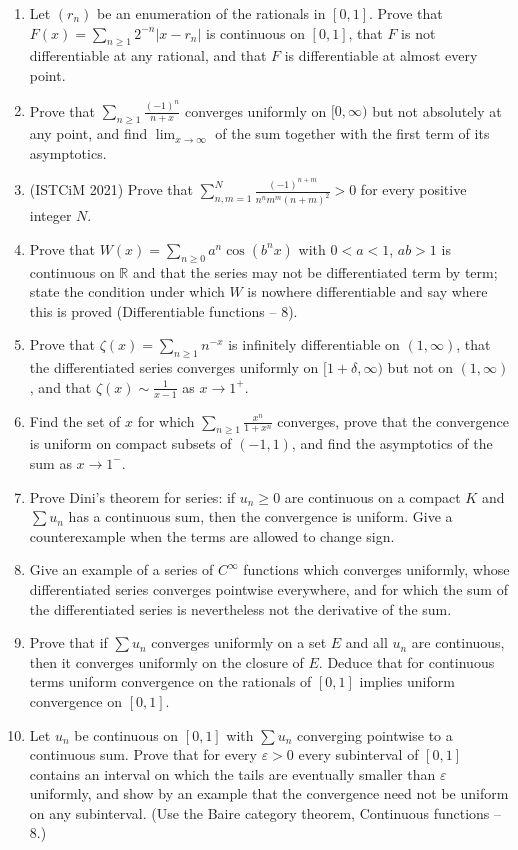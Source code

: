 \documentclass[11pt,a4paper]{article}
\renewcommand{\ge}{\geqslant}
\begin{document}
\begin{enumerate}[itemsep=0.6em]
\item Let $(r_n)$ be an enumeration of the rationals in $[0,1]$. Prove that
$F(x)=\sum_{n\ge1}2^{-n}|x-r_n|$ is continuous on $[0,1]$, that $F$ is not differentiable at any
rational, and that $F$ is differentiable at almost every point.

\item Prove that $\sum_{n\ge1}\frac{(-1)^n}{n+x}$ converges uniformly on $[0,\infty)$ but not
absolutely at any point, and find $\lim_{x\to\infty}$ of the sum together with the first term of
its asymptotics.

\item (ISTCiM 2021) Prove that $\sum\limits_{n,m=1}^N\frac{(-1)^{n+m}}{n^nm^m(n+m)^2}>0$ for every
positive integer $N$.

\item Prove that $W(x)=\sum_{n\ge0}a^n\cos(b^nx)$ with $0<a<1$, $ab>1$ is continuous on $\mathbb R$
and that the series may not be differentiated term by term; state the condition under which $W$ is
nowhere differentiable and say where this is proved (Differentiable functions -- 8).

\item Prove that $\zeta(x)=\sum_{n\ge1}n^{-x}$ is infinitely differentiable on $(1,\infty)$, that the
differentiated series converges uniformly on $[1+\delta,\infty)$ but not on $(1,\infty)$, and that
$\zeta(x)\sim\frac1{x-1}$ as $x\to1^+$.

\item Find the set of $x$ for which $\sum_{n\ge1}\frac{x^n}{1+x^n}$ converges, prove that the
convergence is uniform on compact subsets of $(-1,1)$, and find the asymptotics of the sum as
$x\to1^-$.

\item Prove Dini's theorem for series: if $u_n\ge0$ are continuous on a compact $K$ and $\sum u_n$
has a continuous sum, then the convergence is uniform. Give a counterexample when the terms are
allowed to change sign.

\item Give an example of a series of $C^\infty$ functions which converges uniformly, whose
differentiated series converges pointwise everywhere, and for which the sum of the differentiated
series is nevertheless not the derivative of the sum.

\item Prove that if $\sum u_n$ converges uniformly on a set $E$ and all $u_n$ are continuous, then it
converges uniformly on the closure of $E$. Deduce that for continuous terms uniform convergence on
the rationals of $[0,1]$ implies uniform convergence on $[0,1]$.

\item Let $u_n$ be continuous on $[0,1]$ with $\sum u_n$ converging pointwise to a continuous sum.
Prove that for every $\varepsilon>0$ every subinterval of $[0,1]$ contains an interval on which the
tails are eventually smaller than $\varepsilon$ uniformly, and show by an example that the
convergence need not be uniform on any subinterval. (Use the Baire category theorem, Continuous
functions -- 8.)
\end{enumerate}
\end{document}
